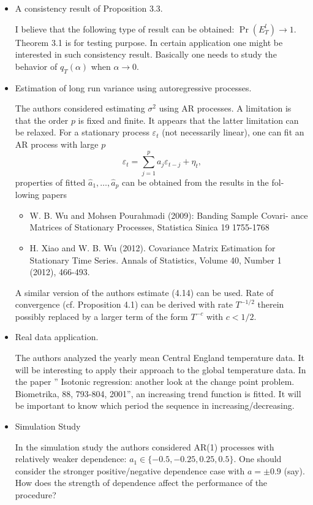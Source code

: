 \documentclass[a4paper,12pt]{article}
\begin{document}
 

\vspace{0.25cm}

\begin{itemize}
\item A consistency result of Proposition 3.3.

I believe that the following type of result can be obtained: $\Pr (E^l_T) \to 1$. Theorem 3.1 is for testing purpose. In certain application one might be interested in such consistency result. Basically one needs to study the behavior of $q_T (\alpha)$ when $\alpha \to 0$.
\item Estimation of long run variance using autoregressive processes.

The authors considered estimating $\sigma^2$ using AR processes. A limitation is that the order $p$ is fixed and finite. It appears that the latter limitation can be relaxed. For a stationary process $\varepsilon_t$ (not necessarily linear), one can fit an AR process with large $p$
$$ \varepsilon_t = \sum_{j=1}^p a_j \varepsilon_{t-j} + \eta_t,$$
properties of fitted $\widehat{a}_1, \ldots, \widehat{a}_p$ can be obtained from the results in the fol-
lowing papers
\begin{itemize}
\item W. B. Wu and Mohsen Pourahmadi (2009): Banding Sample Covari-
ance Matrices of Stationary Processes, Statistica Sinica 19 1755-1768

\item H. Xiao and W. B. Wu (2012). Covariance Matrix Estimation for
Stationary Time Series. Annals of Statistics, Volume 40, Number 1
(2012), 466-493.
\end{itemize}
A similar version of the authors estimate (4.14) can be used. Rate of convergence (cf. Proposition 4.1) can be derived with rate $T^{-1/2}$ therein possibly replaced by a larger term of the form $T^{-c}$ with $c < 1/2$.

\item Real data application.

The authors analyzed the yearly mean Central England temperature data. It will be interesting to apply their approach to the global temperature data. In the paper ” Isotonic regression: another look at the change point problem. Biometrika, 88, 793-804, 2001”, an increasing trend function is fitted. It will be important to know which period the sequence in increasing/decreasing.

\item Simulation Study

In the simulation study the authors considered AR(1) processes with relatively weaker dependence: $a_1 \in \{-0.5, -0.25, 0.25, 0.5\}$. One should consider the stronger positive/negative dependence case with $a = \pm 0.9$ (say). How does the strength of dependence affect the performance of the procedure?

\end{itemize}
\end{document}
